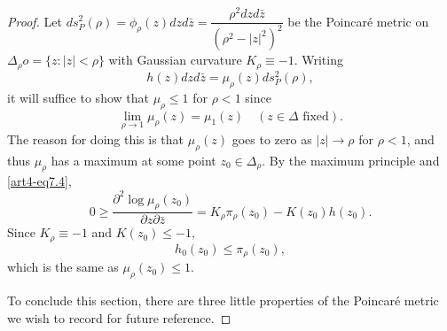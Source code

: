 \begin{proof}
Let $ds^2_P (\rho) = \phi_\rho (z) dz d\bar{z} = \dfrac{\rho^2 d z d \bar{z}}{(\rho^2 - |z|^2)^2}$ be the Poincar\'e metric on $\Delta_\rho o= \{z : |z| < \rho\}$ with Gaussian curvature $K_\rho \equiv -1$. Writing 
$$
h(z) dz d\bar{z} = \mu_\rho (z) ds^2_P (\rho),
$$
it will suffice to show that $\mu_\rho \leqslant 1$ for $\rho < 1$ since
$$
\lim\limits_{\rho \to 1} \mu_\rho (z) = \mu_1 (z) \quad (z \in \Delta \text{ fixed}).
$$
The reason for doing this is that $\mu_\rho (z)$ goes to zero as $|z| \to \rho$ for $\rho< 1$, and thus $\mu_\rho$ has a maximum at some point $z_0 \in \Delta_\rho$. By the maximum principle and \eqref{art4-eq7.4},
$$
0 \geqslant \frac{\partial^2 \log \mu_\rho(z_0)}{\partial z \partial \bar{z}} = K_\rho \pi_\rho (z_0) - K(z_0) h (z_0).
$$
Since $K_{\rho} \equiv -1$ and $K(z_0) \leqslant -1$,
$$
h_0 (z_0) \leqslant \pi_\rho (z_0),
$$
which is the same as $\mu_\rho (z_0) \leqslant 1$.

To conclude this section, there are three little properties of the Poincar\'e metric we wish to record for future reference.
\end{proof}


